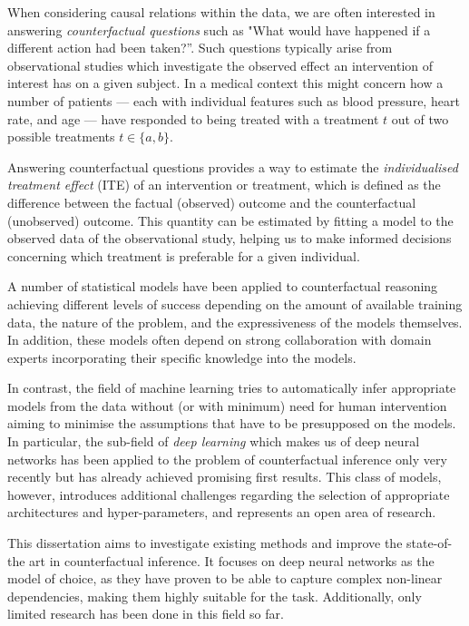 When considering causal relations within the data, we are often interested in answering \emph{counterfactual questions} such as "What would have happened if a different action had been taken?”. Such questions typically arise from observational studies which investigate the observed effect an intervention of interest has on a given subject. In a medical context this might concern how a number of patients — each with individual features such as blood pressure, heart rate, and age — have responded to being treated with a treatment $t$ out of two possible treatments $t \in \{a, b\}$.

Answering counterfactual questions provides a way to estimate the \emph{individualised treatment effect} (ITE) of an intervention or treatment, which is defined as the difference between the factual (observed) outcome and the counterfactual (unobserved) outcome. This quantity can be estimated by fitting a model to the observed data of the observational study, helping us to make informed decisions concerning which treatment is preferable for a given individual.

A number of statistical models have been applied to counterfactual reasoning achieving different levels of success depending on the amount of available training data, the nature of the problem, and the expressiveness of the models themselves. In addition, these models often depend on strong collaboration with domain experts incorporating their specific knowledge into the models. 


In contrast, the field of machine learning tries to automatically infer appropriate models from the data without (or with minimum) need for human intervention aiming to minimise the assumptions that have to be presupposed on the models. In particular, the sub-field of \emph{deep learning} which makes us of deep neural networks has been applied to the problem of counterfactual inference only very recently but has already achieved promising first results. This class of models, however, introduces additional challenges regarding the selection of appropriate architectures and hyper-parameters, and represents an open area of research.  

This dissertation aims to investigate existing methods and improve the state-of-the art in counterfactual inference. It focuses on deep neural networks as the model of choice, as they have proven to be able to capture complex non-linear dependencies, making them highly suitable for the task. Additionally, only limited research has been done in this field so far.


